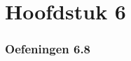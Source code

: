 \documentclass[lineaire_algebra_oplossingen.tex]{subfiles}
\begin{document}
\newpage
\part{Hoofdstuk 6}
\section{Oefeningen 6.8}
\end{document}
